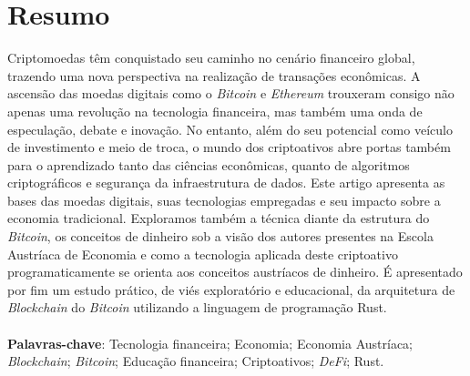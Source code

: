 \documentclass[article,12pt,oneside,a4paper,english,brazil]{unifil}
\date{}
\begin{document}
\frenchspacing
\maketitle
\normalsize

\fontsize{10}{1}\selectfont
\section*{Resumo}
Criptomoedas têm conquistado seu caminho no cenário financeiro global, trazendo uma nova perspectiva na realização de transações econômicas. A ascensão das moedas digitais como o \textit{Bitcoin} e \textit{Ethereum} trouxeram consigo não apenas uma revolução na tecnologia financeira, mas também uma onda de especulação, debate e inovação. No entanto, além do seu potencial como veículo de investimento e meio de troca, o mundo dos criptoativos abre portas também para o aprendizado tanto das ciências econômicas, quanto de algoritmos criptográficos e segurança da infraestrutura de dados. Este artigo apresenta as bases das moedas digitais, suas tecnologias empregadas e seu impacto sobre a economia tradicional. Exploramos também a técnica diante da estrutura do \textit{Bitcoin}, os conceitos de dinheiro sob a visão dos autores presentes na Escola Austríaca de Economia e como a tecnologia aplicada deste criptoativo programaticamente se orienta aos conceitos austríacos de dinheiro. É apresentado por fim um estudo prático, de viés exploratório e educacional, da arquitetura de \textit{Blockchain} do \textit{Bitcoin} utilizando a linguagem de programação Rust.\\
\vspace{\onelineskip} \\
\noindent
\textbf{Palavras-chave}: Tecnologia financeira; Economia; Economia Austríaca; \textit{Blockchain}; \textit{Bitcoin}; Educação financeira; Criptoativos; \textit{DeFi}; Rust.
\end{document}
